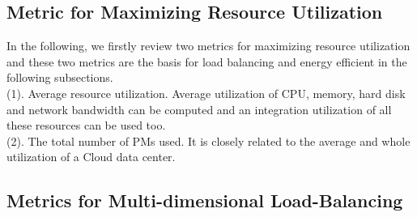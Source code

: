 \documentclass[3p, twocolumn]{elsarticle}
\begin{document}
\subsection{Metric for Maximizing Resource Utilization}
In the following, we firstly review two metrics for maximizing resource utilization and these two metrics are the basis for load balancing and energy efficient in the following subsections.\\
\noindent (1). Average resource utilization. Average utilization of CPU, memory, hard disk and network bandwidth can be computed and an integration utilization of all these resources can be used too. \\
(2). The total number of PMs used. It is closely related to the average and whole utilization of a Cloud data center.\\

\subsection{Metrics for Multi-dimensional Load-Balancing}
\end{document}
